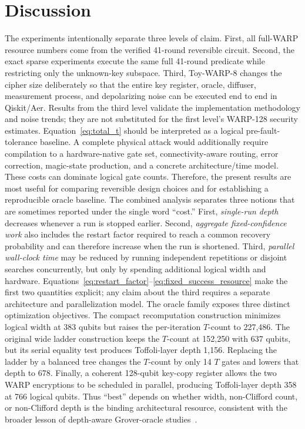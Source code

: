 \documentclass[10pt,a4paper]{article}
\begin{document}
\section{Discussion}
The experiments intentionally separate three levels of claim.  First, all full-WARP resource numbers come from the verified 41-round reversible circuit.  Second, the exact sparse experiments execute the same full 41-round predicate while restricting only the unknown-key subspace.  Third, Toy-WARP-8 changes the cipher size deliberately so that the entire key register, oracle, diffuser, measurement process, and depolarizing noise can be executed end to end in Qiskit/Aer.  Results from the third level validate the implementation methodology and noise trends; they are not substituted for the first level's WARP-128 security estimates.
Equation~\eqref{eq:total_t} should be interpreted as a logical pre-fault-tolerance baseline. A complete physical attack would additionally require compilation to a hardware-native gate set, connectivity-aware routing, error correction, magic-state production, and a concrete architecture/time model. These costs can dominate logical gate counts. Therefore, the present results are most useful for comparing reversible design choices and for establishing a reproducible oracle baseline.
The combined analysis separates three notions that are sometimes reported under the single word ``cost.''  First, \emph{single-run depth} decreases whenever a run is stopped earlier.  Second, \emph{aggregate fixed-confidence work} also includes the restart factor required to reach a common recovery probability and can therefore increase when the run is shortened.  Third, \emph{parallel wall-clock time} may be reduced by running independent repetitions or disjoint searches concurrently, but only by spending additional logical width and hardware.  Equations~\eqref{eq:restart_factor}--\eqref{eq:fixed_success_resource} make the first two quantities explicit; any claim about the third requires a separate architecture and parallelization model.
The oracle family exposes three distinct optimization objectives. The compact recomputation construction minimizes logical width at 383 qubits but raises the per-iteration $T$-count to 227,486. The original wide ladder construction keeps the $T$-count at 152,250 with 637 qubits, but its serial equality test produces Toffoli-layer depth 1,156. Replacing the ladder by a balanced tree changes the $T$-count by only 14 $T$ gates and lowers that depth to 678. Finally, a coherent 128-qubit key-copy register allows the two WARP encryptions to be scheduled in parallel, producing Toffoli-layer depth 358 at 766 logical qubits. Thus ``best'' depends on whether width, non-Clifford count, or non-Clifford depth is the binding architectural resource, consistent with the broader lesson of depth-aware Grover-oracle studies~\cite{Jaques2020,Rahman2022}.
\end{document}
